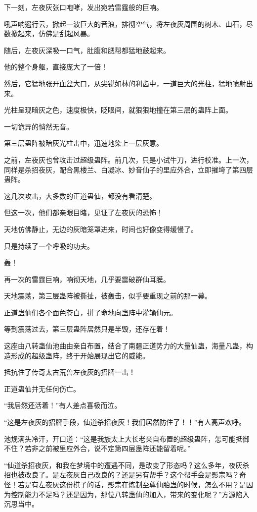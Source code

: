 \begin{this_body}
下一刻，左夜灰张口咆哮，发出宛若雷霆般的巨响。

吼声响遏行云，掀起一波巨大的音浪，排彻空气，将左夜灰周围的树木、山石，尽数掀起来，仿佛是刮起风暴。

随后，左夜灰深吸一口气，肚腹和腮帮都猛地鼓起来。

他的整个身躯，直接庞大了一倍！

然后，它猛地张开血盆大口，从尖锐如林的利齿中，一道巨大的光柱，猛地喷射出来。

光柱呈现暗灰之色，速度极快，眨眼间，就狠狠地撞在第三层的蛊阵上面。

一切诡异的悄然无音。

第三层蛊阵被暗灰光柱击中，迅速地染上一层灰意。

之前，左夜灰也曾攻击过超级蛊阵。前几次，只是小试牛刀，进行校准。上一次，同样是杀招夜灰，配合黑楼兰、白凝冰、妙音仙子的里应外合，立即摧垮了第四层蛊阵。

这几次攻击，大多数的正道蛊仙，都没有看清楚。

但这一次，他们都亲眼目睹，见证了左夜灰的恐怖！

天地仿佛静止，无边的灰暗笼罩进来，时间也好像变得缓慢了。

只是持续了一个呼吸的功夫。

轰！

再一次的雷霆巨响，响彻天地，几乎要震破群仙耳膜。

天地震荡，第三层蛊阵被撕扯，被轰击，似乎要重现之前的那一幕。

正道蛊仙们各个面色苍白，拼了命地向蛊阵中灌输仙元。

等到震荡过去，第三层蛊阵居然只是半毁，还存在着！

这座由八转蛊仙池曲由亲自布置，结合了南疆正道势力的大量仙蛊，海量凡蛊，构造形成的超级蛊阵，终于开始展现出它的威能。

抵抗住了传奇太古荒兽左夜灰的招牌一击！

正道蛊仙并无任何伤亡。

“我居然还活着！”有人差点喜极而泣。

“这是左夜灰的招牌手段，仙道杀招夜灰！我们居然防住了！！”有人高声欢呼。

池规满头冷汗，开口道：“这是我族太上大长老亲自布置的超级蛊阵，怎可能抵御不住？若非之前被里应外合，说不定第四层蛊阵还能留着呢。”

“仙道杀招夜灰，和我在梦境中的遭遇不同，是改变了形态吗？这么多年，夜灰杀招也被改良了。是左夜灰自己改良的？还是另有帮手？这个帮手会是影宗吗？奇怪！若是有左夜灰这份棋子的话，影宗在炼制至尊仙胎蛊的时候，怎么不用？是因为控制能力不足吗？还是因为，那位八转蛊仙的加入，带来的变化呢？”方源陷入沉思当中。


\end{this_body}
